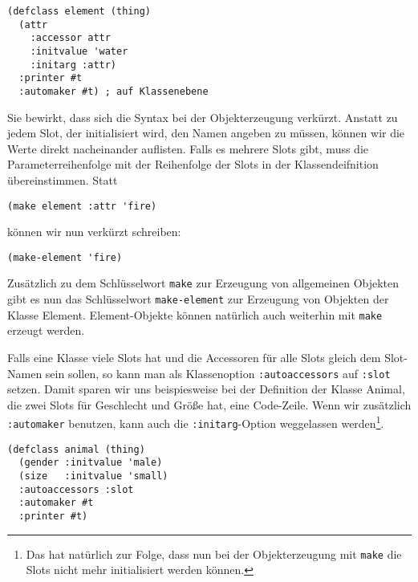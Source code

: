 \begin{lstlisting}
(defclass element (thing)
  (attr
    :accessor attr
    :initvalue 'water
    :initarg :attr)
  :printer #t
  :automaker #t) ; auf Klassenebene
\end{lstlisting}

Sie bewirkt, dass sich die Syntax bei der Objekterzeugung verkürzt. Anstatt zu jedem Slot, der initialisiert wird, den Namen angeben zu müssen, können wir die Werte direkt nacheinander auflisten. Falls es mehrere Slots gibt, muss die Parameterreihenfolge mit der Reihenfolge der Slots in der Klassendeifnition übereinstimmen. Statt

\begin{lstlisting}
(make element :attr 'fire)
\end{lstlisting}

können wir nun verkürzt schreiben:

\begin{lstlisting}
(make-element 'fire)
\end{lstlisting}

Zusätzlich zu dem Schlüsselwort \texttt{make} zur Erzeugung von allgemeinen Objekten gibt es nun das Schlüsselwort \texttt{make-element} zur Erzeugung von Objekten der Klasse Element. Element-Objekte können natürlich auch weiterhin mit \texttt{make} erzeugt werden.

Falls eine Klasse viele Slots hat und die Accessoren für alle Slots gleich dem Slot-Namen sein sollen, so kann man als Klassenoption \texttt{:autoaccessors} auf \texttt{:slot} setzen. Damit sparen wir uns beispiesweise bei der Definition der Klasse Animal, die zwei Slots für Geschlecht und Größe hat, eine Code-Zeile. Wenn wir zusätzlich \texttt{:automaker} benutzen, kann auch die \texttt{:initarg}-Option  weggelassen werden\footnote{Das hat natürlich zur Folge, dass nun bei der Objekterzeugung mit \texttt{make} die Slots nicht mehr initialisiert werden können.}.

\begin{lstlisting}
(defclass animal (thing)
  (gender :initvalue 'male)
  (size   :initvalue 'small)
  :autoaccessors :slot
  :automaker #t
  :printer #t)
\end{lstlisting}



